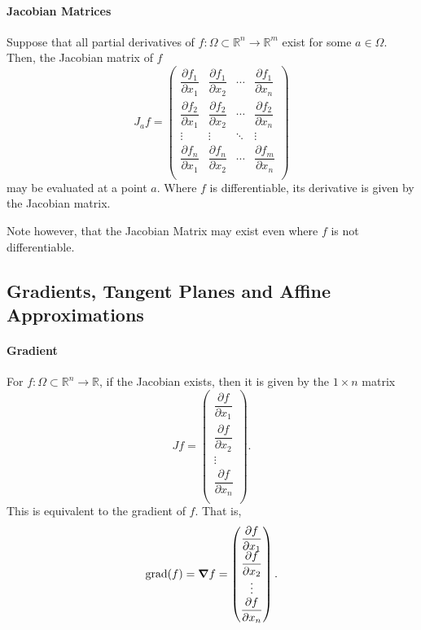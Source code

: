 \paragraph{Jacobian Matrices}
Suppose that all partial derivatives of \(f:\Omega \subset \mathbb{R}^n \to \mathbb{R}^m\)
exist for some \(a\in \Omega\). Then, the Jacobian matrix of \(f\)
\[
    J_a f = 
    \begin{pmatrix}
        \dfrac{\partial f_1}{\partial x_1} & \dfrac{\partial f_1}{\partial x_2} & \cdots & \dfrac{\partial f_1}{\partial x_n} \\
    \dfrac{\partial f_2}{\partial x_1} & \dfrac{\partial f_2}{\partial x_2} & \cdots & \dfrac{\partial f_2}{\partial x_n} \\
    \vdots & \vdots & \ddots & \vdots \\
    \dfrac{\partial f_n}{\partial x_1} & \dfrac{\partial f_n}{\partial x_2} & \cdots & \dfrac{\partial f_m}{\partial x_n} \\
    \end{pmatrix}
\]
may be evaluated at a point \(a\).
Where \(f\) is differentiable, its derivative is given by the Jacobian matrix.

Note however, that the Jacobian Matrix may exist even where \(f\) is not differentiable.

\subsection{Gradients, Tangent Planes and Affine Approximations}

\paragraph{Gradient}
For \(f: \Omega\subset \mathbb{R}^n\to \mathbb{R}\), if the Jacobian exists,
then it is given by the \(1\times n\) matrix
\[
    Jf = \begin{pmatrix}
        \dfrac{\partial f}{\partial x_1} \\
        \dfrac{\partial f}{\partial x_2} \\
        \vdots                           \\
        \dfrac{\partial f}{\partial x_n} \\
    \end{pmatrix}.
\]
This is equivalent to the gradient of \(f\). That is,
\[
    \text{grad}(f) = \grad f = 
    \begin{pmatrix}
        \dfrac{\partial f}{\partial x_1} \\
        \dfrac{\partial f}{\partial x_2} \\
        \vdots                           \\
        \dfrac{\partial f}{\partial x_n} \\
    \end{pmatrix}.
\]

